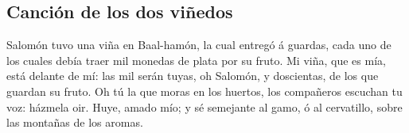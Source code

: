 \hypertarget{canciuxf3n-de-los-dos-viuxf1edos}{%
\subsection{Canción de los dos
viñedos}\label{canciuxf3n-de-los-dos-viuxf1edos}}

 Salomón tuvo una viña en Baal-hamón, la cual entregó á
guardas, cada uno de los cuales debía traer mil monedas de plata por su
fruto.  Mi viña, que es mía, está delante de mí: las mil
serán tuyas, oh Salomón, y doscientas, de los que guardan su fruto.
 Oh tú la que moras en los huertos, los compañeros
escuchan tu voz: házmela oir.  Huye, amado mío; y sé
semejante al gamo, ó al cervatillo, sobre las montañas de los aromas.
